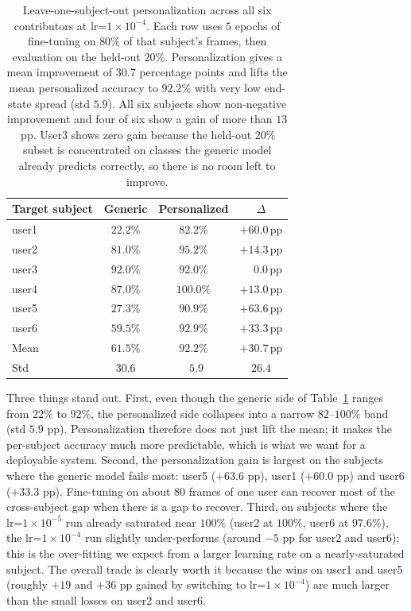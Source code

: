 \documentclass[12pt,a4paper]{article}
\begin{document}
\begin{table}[H]
  \centering
  \footnotesize
  \begin{tabular}{lccc}
    \toprule
    Target subject & Generic & Personalized & $\Delta$ \\
    \midrule
    user1 & $22.2\%$ & $82.2\%$  & $+60.0$\,pp \\
    user2 & $81.0\%$ & $95.2\%$  & $+14.3$\,pp \\
    user3 & $92.0\%$ & $92.0\%$  & $\phantom{+}0.0$\,pp \\
    user4 & $87.0\%$ & $100.0\%$ & $+13.0$\,pp \\
    user5 & $27.3\%$ & $90.9\%$  & $+63.6$\,pp \\
    user6 & $59.5\%$ & $92.9\%$  & $+33.3$\,pp \\
    \midrule
    Mean  & $\mathbf{61.5\%}$ & $\mathbf{92.2\%}$ & $\mathbf{+30.7}$\,pp \\
    Std   & $30.6$ & $\phantom{0}5.9$ & $26.4$ \\
    \bottomrule
  \end{tabular}
  \caption{\footnotesize Leave-one-subject-out personalization across all
  six contributors at lr=$1\times 10^{-4}$. Each row uses $5$
  epochs of fine-tuning on $80\%$ of that subject's frames,
  then evaluation on the held-out $20\%$. Personalization
  gives a mean improvement of $30.7$ percentage points and
  lifts the mean personalized accuracy to $92.2\%$ with very
  low end-state spread (std $5.9$). All six subjects show
  non-negative improvement and four of six show a gain of
  more than $13$\,pp. User3 shows zero gain because the
  held-out $20\%$ subset is concentrated on classes the
  generic model already predicts correctly, so there is no
  room left to improve.}
  \label{tab:beta}
\end{table}

Three things stand out. First, even though the generic side
of Table~\ref{tab:beta} ranges from $22\%$ to $92\%$, the
personalized side collapses into a narrow $82$--$100\%$ band
(std $5.9$ pp). Personalization therefore does not just lift
the mean; it makes the per-subject accuracy much more
predictable, which is what we want for a deployable system.
Second, the personalization gain is largest on the subjects
where the generic model fails most: user5 ($+63.6$ pp), user1
($+60.0$ pp) and user6 ($+33.3$ pp). Fine-tuning on about
$80$ frames of one user can recover most of the cross-subject
gap when there is a gap to recover. Third, on subjects where
the lr=$1\times 10^{-5}$ run already saturated near $100\%$
(user2 at $100\%$, user6 at $97.6\%$), the lr=$1\times 10^{-4}$
run slightly under-performs (around $-5$ pp for user2 and
user6); this is the over-fitting we expect from a larger
learning rate on a nearly-saturated subject. The overall
trade is clearly worth it because the wins on user1 and user5
(roughly $+19$ and $+36$ pp gained by switching to
lr=$1\times 10^{-4}$) are much larger than the small losses
on user2 and user6.
\end{document}
